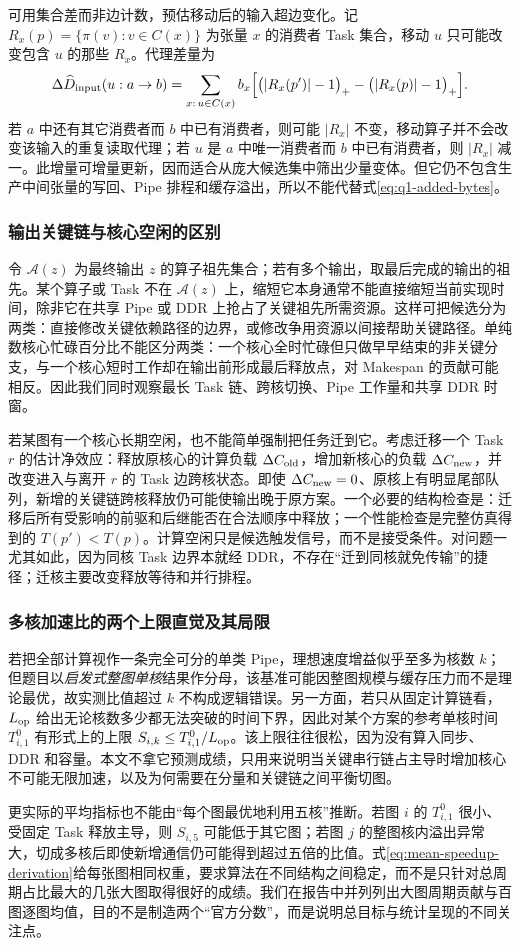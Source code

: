 可用集合差而非边计数，预估移动后的输入超边变化。记 $R_x(p)=\{\pi(v):v\in C(x)\}$ 为张量 $x$ 的消费者 Task 集合，移动 $u$ 只可能改变包含 $u$ 的那些 $R_x$。代理差量为
\begin{equation}\label{eq:q1-local-hyperedge-delta}
\Delta\widehat D_{\rm input}(u:a\to b)=
\sum_{x:\,u\in C(x)}b_x\Bigl[
\bigl(|R_x(p')|-1\bigr)_+
-\bigl(|R_x(p)|-1\bigr)_+\Bigr].
\end{equation}
若 $a$ 中还有其它消费者而 $b$ 中已有消费者，则可能 $|R_x|$ 不变，移动算子并不会改变该输入的重复读取代理；若 $u$ 是 $a$ 中唯一消费者而 $b$ 中已有消费者，则 $|R_x|$ 减一。此增量可增量更新，因而适合从庞大候选集中筛出少量变体。但它仍不包含生产中间张量的写回、Pipe 排程和缓存溢出，所以不能代替式\eqref{eq:q1-added-bytes}。

\subsubsection{输出关键链与核心空闲的区别}
令 $\mathcal A(z)$ 为最终输出 $z$ 的算子祖先集合；若有多个输出，取最后完成的输出的祖先。某个算子或 Task 不在 $\mathcal A(z)$ 上，缩短它本身通常不能直接缩短当前实现时间，除非它在共享 Pipe 或 DDR 上抢占了关键祖先所需资源。这样可把候选分为两类：直接修改关键依赖路径的边界，或修改争用资源以间接帮助关键路径。单纯数核心忙碌百分比不能区分两类：一个核心全时忙碌但只做早早结束的非关键分支，与一个核心短时工作却在输出前形成最后释放点，对 Makespan 的贡献可能相反。因此我们同时观察最长 Task 链、跨核切换、Pipe 工作量和共享 DDR 时窗。

若某图有一个核心长期空闲，也不能简单强制把任务迁到它。考虑迁移一个 Task $r$ 的估计净效应：释放原核心的计算负载 $\Delta C_{\rm old}$，增加新核心的负载 $\Delta C_{\rm new}$，并改变进入与离开 $r$ 的 Task 边跨核状态。即使 $\Delta C_{\rm new}=0$、原核上有明显尾部队列，新增的关键链跨核释放仍可能使输出晚于原方案。一个必要的结构检查是：迁移后所有受影响的前驱和后继能否在合法顺序中释放；一个性能检查是完整仿真得到的 $T(p')<T(p)$。计算空闲只是候选触发信号，而不是接受条件。对问题一尤其如此，因为同核 Task 边界本就经 DDR，不存在“迁到同核就免传输”的捷径；迁核主要改变释放等待和并行排程。

\subsubsection{多核加速比的两个上限直觉及其局限}
若把全部计算视作一条完全可分的单类 Pipe，理想速度增益似乎至多为核数 $k$；但题目以\emph{启发式整图单核}结果作分母，该基准可能因整图规模与缓存压力而不是理论最优，故实测比值超过 $k$ 不构成逻辑错误。另一方面，若只从固定计算链看，$L_{\rm op}$ 给出无论核数多少都无法突破的时间下界，因此对某个方案的参考单核时间 $T^0_{i,1}$ 有形式上的上限 $S_{i,k}\le T^0_{i,1}/L_{\rm op}$。该上限往往很松，因为没有算入同步、DDR 和容量。本文不拿它预测成绩，只用来说明当关键串行链占主导时增加核心不可能无限加速，以及为何需要在分量和关键链之间平衡切图。

更实际的平均指标也不能由“每个图最优地利用五核”推断。若图 $i$ 的 $T^0_{i,1}$ 很小、受固定 Task 释放主导，则 $S_{i,5}$ 可能低于其它图；若图 $j$ 的整图核内溢出异常大，切成多核后即使新增通信仍可能得到超过五倍的比值。式\eqref{eq:mean-speedup-derivation}给每张图相同权重，要求算法在不同结构之间稳定，而不是只针对总周期占比最大的几张大图取得很好的成绩。我们在报告中并列列出大图周期贡献与百图逐图均值，目的不是制造两个“官方分数”，而是说明总目标与统计呈现的不同关注点。
